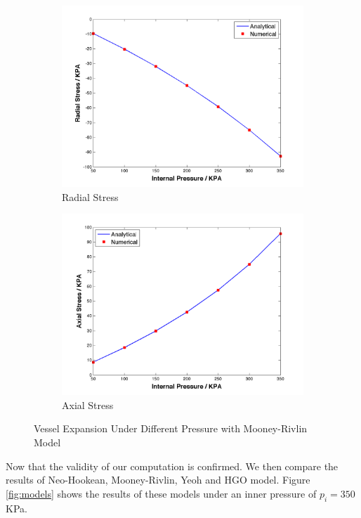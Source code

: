 \begin{figure}[t!p]
	\begin{subfigure}[b]{0.5\textwidth}
		\centering
		\includegraphics[width=\textwidth]{./figures/radial.png}
		\caption{Radial Stress}
		\label{radial}
	\end{subfigure}
	\begin{subfigure}[b]{0.5\textwidth}
		\centering
		\includegraphics[width=\textwidth]{./figures/axial.png}
		\caption{Axial Stress}
		\label{axial}
	\end{subfigure}
	\caption{Vessel Expansion Under Different Pressure with Mooney-Rivlin Model}
	\label{fig:mooney-rivlin2}
\end{figure}

Now that the validity of our computation is confirmed. We then compare the results of Neo-Hookean, Mooney-Rivlin, Yeoh and HGO model. Figure \ref{fig:models} shows the results of these models under an inner pressure of $p_i = 350$ KPa. 

